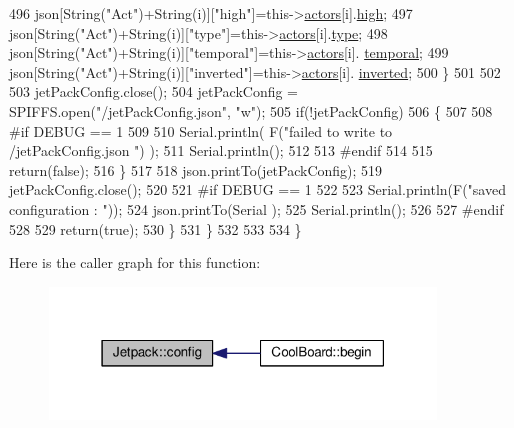\begin{DoxyCode}
496                 json[String(\textcolor{stringliteral}{"Act"})+String(i)][\textcolor{stringliteral}{"high"}]=this->\hyperlink{classJetpack_a7e16d2f97837f9712a2e6de1c50d99db}{actors}[i].\hyperlink{structJetpack_1_1state_a54cc9291c7cc30102a07fd2b0ccd8dde}{high};
497                 json[String(\textcolor{stringliteral}{"Act"})+String(i)][\textcolor{stringliteral}{"type"}]=this->\hyperlink{classJetpack_a7e16d2f97837f9712a2e6de1c50d99db}{actors}[i].\hyperlink{structJetpack_1_1state_a9143580871c2e573fb502bb94c1da8e5}{type};
498                 json[String(\textcolor{stringliteral}{"Act"})+String(i)][\textcolor{stringliteral}{"temporal"}]=this->\hyperlink{classJetpack_a7e16d2f97837f9712a2e6de1c50d99db}{actors}[i].
      \hyperlink{structJetpack_1_1state_abd6039e7a48856550b0ffbf8bcff7bdd}{temporal};
499                 json[String(\textcolor{stringliteral}{"Act"})+String(i)][\textcolor{stringliteral}{"inverted"}]=this->\hyperlink{classJetpack_a7e16d2f97837f9712a2e6de1c50d99db}{actors}[i].
      \hyperlink{structJetpack_1_1state_a6bc03bb8f05b10aa142dbb0c39c87fb5}{inverted}; 
500             \}
501             
502 
503             jetPackConfig.close();          
504             jetPackConfig = SPIFFS.open(\textcolor{stringliteral}{"/jetPackConfig.json"}, \textcolor{stringliteral}{"w"});            
505             \textcolor{keywordflow}{if}(!jetPackConfig)
506             \{
507             
508 \textcolor{preprocessor}{            #if DEBUG == 1 }
509 
510                 Serial.println( F(\textcolor{stringliteral}{"failed to write to /jetPackConfig.json "}) );
511                 Serial.println();
512             
513 \textcolor{preprocessor}{            #endif}
514                 
515                 \textcolor{keywordflow}{return}(\textcolor{keyword}{false});          
516             \}  
517 
518             json.printTo(jetPackConfig);
519             jetPackConfig.close();
520 
521 \textcolor{preprocessor}{        #if DEBUG == 1 }
522             
523             Serial.println(F(\textcolor{stringliteral}{"saved configuration : "}));
524             json.printTo(Serial );
525             Serial.println();       
526         
527 \textcolor{preprocessor}{        #endif}
528 
529             \textcolor{keywordflow}{return}(\textcolor{keyword}{true}); 
530         \}
531     \}   
532     
533 
534 \}
\end{DoxyCode}
Here is the caller graph for this function\+:\nopagebreak
\begin{figure}[H]
\begin{center}
\leavevmode
\includegraphics[width=291pt]{classJetpack_ab065ee83e244265a2223a22f3ee4a719_icgraph}
\end{center}
\end{figure}
\mbox{\label{classJetpack_a9e703197093094b963f9ad57817495b8}} 

